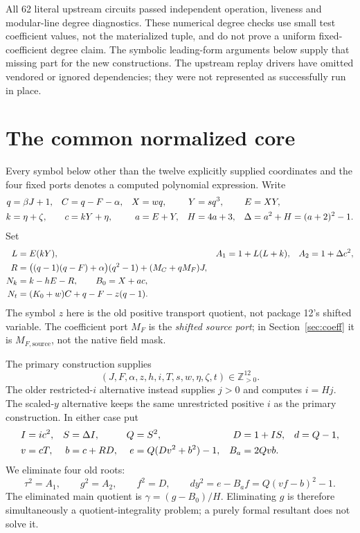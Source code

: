 \documentclass[11pt]{article}
\newcommand{\Pos}{\mathbb Z_{>0}}
\begin{document}
All 62 literal upstream circuits passed independent operation, liveness and modular-line degree diagnostics. These numerical degree checks use small test coefficient values, not the materialized tuple, and do not prove a uniform fixed-coefficient degree claim. The symbolic leading-form arguments below supply that missing part for the new constructions. The upstream replay drivers have omitted vendored or ignored dependencies; they were not represented as successfully run in place.

\section{The common normalized core}\label{sec:core}

Every symbol below other than the twelve explicitly supplied coordinates and the four fixed ports denotes a computed polynomial expression. Write
\begin{align}
 q&=\beta J+1,& C&=q-F-\alpha,& X&=wq,&Y&=sq^3,&E&=XY,\notag\\
 k&=\eta+\zeta,&c&=kY+\eta,&a&=E+Y,&H&=4a+3,&\Delta&=a^2+H=(a+2)^2-1.\label{eq:geometry}
\end{align}
Set
\begin{align}
 L&=E(kY),& A_1&=1+L(L+k),&A_2&=1+\Delta c^2,\notag\\
 R&=\bigl((q-1)(q-F)+\alpha\bigr)(q^2-1)+(M_C+qM_F)J,\label{eq:rank}\\
 N_k&=k-hE-R,\qquad B_0=X+ac,\notag\\
N_t&=(K_0+w)C+q-F-z(q-1).\notag
\end{align}
The symbol $z$ here is the old positive transport quotient, not package 12's shifted variable. The coefficient port $M_F$ is the \emph{shifted source port}; in Section~\ref{sec:coeff} it is $M_{F,\mathrm{source}}$, not the native field mask.

The primary construction supplies
\[
(J,F,\alpha,z,h,i,T,s,w,\eta,\zeta,t)\in\Pos^{12}.
\]
The older restricted-$i$ alternative instead supplies $j>0$ and computes $i=Hj$. The scaled-$y$ alternative keeps the same unrestricted positive $i$ as the primary construction. In either case put
\begin{align}
 I&=ic^2,& S&=\Delta I,&Q&=S^2,&D&=1+IS,&d&=Q-1,\notag\\
 v&=cT,& b&=c+RD,& e&=Q(Dv^2+b^2)-1,&B_a&=2Qvb.\label{eq:aux}
\end{align}
We eliminate four old roots:
\begin{equation}\label{eq:fourroots}
 \tau^2=A_1,\qquad g^2=A_2,\qquad f^2=D,\qquad
 d y^2=e-B_af=Q(vf-b)^2-1.
\end{equation}
The eliminated main quotient is $\gamma=(g-B_0)/H$. Eliminating $g$ is therefore simultaneously a quotient-integrality problem; a purely formal resultant does not solve it.
\end{document}
